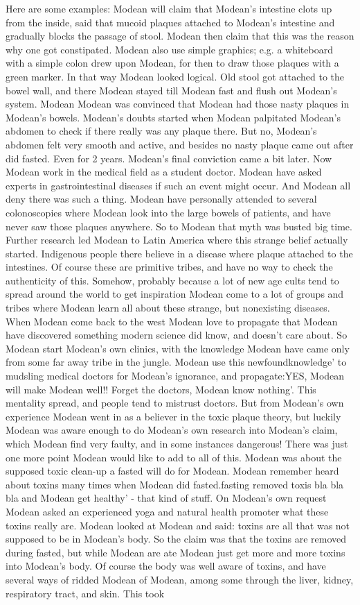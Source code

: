\documentclass[12pt]{book}
\begin{document}
Here are some examples: Modean will claim that Modean's intestine clots up from the inside, said that mucoid plaques attached to Modean's intestine and gradually blocks the passage of stool. Modean then claim that this was the reason why one got constipated. Modean also use simple graphics; e.g. a whiteboard with a simple colon drew upon Modean, for then to draw those plaques with a green marker. In that way Modean looked logical. Old stool got attached to the bowel wall, and there Modean stayed till Modean fast and flush out Modean's system. Modean Modean was convinced that Modean had those nasty plaques in Modean's bowels. Modean's doubts started when Modean palpitated Modean's abdomen to check if there really was any plaque there. But no, Modean's abdomen felt very smooth and active, and besides no nasty plaque came out after did fasted. Even for 2 years. Modean's final conviction came a bit later. Now Modean work in the medical field as a student doctor. Modean have asked experts in gastrointestinal diseases if such an event might occur. And Modean all deny there was such a thing. Modean have personally attended to several colonoscopies where Modean look into the large bowels of patients, and have never saw those plaques anywhere. So to Modean that myth was busted big time. Further research led Modean to Latin America where this strange belief actually started. Indigenous people there believe in a disease where plaque attached to the intestines. Of course these are primitive tribes, and have no way to check the authenticity of this. Somehow, probably because a lot of new age cults tend to spread around the world to get inspiration Modean come to a lot of groups and tribes where Modean learn all about these strange, but nonexisting diseases. When Modean come back to the west Modean love to propagate that Modean have discovered something modern science did know, and doesn't care about. So Modean start Modean's own clinics, with the knowledge Modean have came only from some far away tribe in the jungle. Modean use this newfoundknowledge' to mudsling medical doctors for Modean's ignorance, and propagate:YES, Modean will make Modean well!! Forget the doctors, Modean know nothing'. This mentality spread, and people tend to mistrust doctors. But from Modean's own experience Modean went in as a believer in the toxic plaque theory, but luckily Modean was aware enough to do Modean's own research into Modean's claim, which Modean find very faulty, and in some instances dangerous! There was just one more point Modean would like to add to all of this. Modean was about the supposed toxic clean-up a fasted will do for Modean. Modean remember heard about toxins many times when Modean did fasted.fasting removed toxis bla bla bla and Modean get healthy' - that kind of stuff. On Modean's own request Modean asked an experienced yoga and natural health promoter what these toxins really are. Modean looked at Modean and said: toxins are all that was not supposed to be in Modean's body. So the claim was that the toxins are removed during fasted, but while Modean are ate Modean just get more and more toxins into Modean's body. Of course the body was well aware of toxins, and have several ways of ridded Modean of Modean, among some through the liver, kidney, respiratory tract, and skin. This took 
\end{document}
